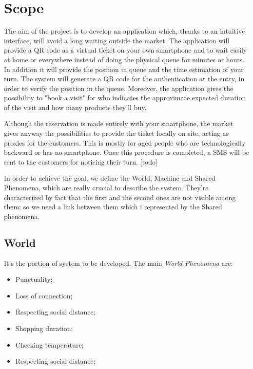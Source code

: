  
\section{Scope}

The aim of the project is to develop an application which, thanks to an intuitive interface, will avoid a long waiting outside the market.
The application will provide a QR code as a virtual ticket on your own smartphone and to wait easily at home or everywhere instead of doing the physical queue for minutes or hours. 
In addition it will provide the position in queue and the time estimation of your turn.
The system will generate a QR code for the authentication at the entry, in order to verify the position in the queue. 
Moreover, the application gives the possibility to "book a visit" for who indicates the approximate expected duration of the visit and how many products they'll buy. \par \medskip
Although the reservation is made entirely with your smartphone, the market gives anyway the possibilities to provide the ticket locally on site, acting as proxies for the customers. This is mostly for aged people who are technologically backward or has no smartphone.
Once this procedure is completed, a SMS will be sent to the customers for noticing their turn. [todo]\par \medskip
In order to achieve the goal, we define the World, Machine and Shared Phenomena, which are really crucial to describe the system. They're characterized by fact that the first and the second ones are not visible among them; so we need a link between them which i represented by the Shared phenomena.






\subsection{World}
It's the portion of system to be developed. The main \textit{World Phenomena} are:

\begin{itemize}
\item Punctuality;
\item Loss of connection;
\item Respecting social distance;
\item Shopping duration;
\item Checking temperature;
\item Respecting social distance;
\end{itemize}

